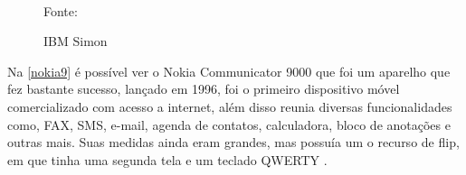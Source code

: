 \begin{figure}[!htpb]
	\centering
	\caption{IBM Simon}
	\\
	{\footnotesize Fonte: \cite{historia_mobile}}
	\label{simon}
\end{figure}

Na \autoref{nokia9} é possível ver o Nokia Communicator 9000 que foi um aparelho que fez bastante sucesso, lançado em 1996, foi o primeiro dispositivo móvel comercializado com acesso a internet, além disso reunia diversas funcionalidades como,  FAX, SMS, e-mail, agenda de contatos, calculadora, bloco de anotações e outras mais. Suas medidas ainda eram grandes, mas possuía um o recurso de flip, em que tinha uma segunda tela e um teclado QWERTY \cite{historia_mobile}.


